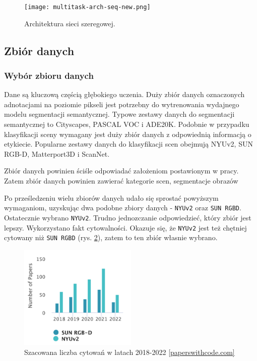 \begin{figure}[ht!]
    \centering
    \texttt{[image: multitask-arch-seq-new.png]}
    \caption{Architektura sieci szeregowej.}
    \label{fig:multitask-seq}
\end{figure}



\subsection{Zbiór  danych}
\subsubsection{Wybór zbioru danych}
Dane są kluczową częścią głębokiego uczenia. Duży zbiór danych oznaczonych adnotacjami na poziomie pikseli jest potrzebny do wytrenowania wydajnego modelu segmentacji semantycznej. Typowe zestawy danych do segmentacji semantycznej to Cityscapes, PASCAL VOC i ADE20K. Podobnie w przypadku klasyfikacji sceny wymagany jest duży zbiór danych z odpowiednią informacją o etykiecie. Popularne zestawy danych do klasyfikacji scen obejmują  NYUv2, SUN RGB-D, Matterport3D i ScanNet.

Zbiór danych powinien ściśle odpowiadać założeniom postawionym w pracy. Zatem zbiór danych powinien zawierać kategorie scen, segmentacje obrazów 

Po prześledzeniu wielu zbiorów danych udało się sprostać powyższym wymaganiom, uzyskując dwa podobne zbiory danych - \texttt{NYUv2} oraz \texttt{SUN RGBD}. Ostatecznie wybrano \texttt{NYUv2}. Trudno jednozczanie odpowiedzieć, który zbiór jest lepszy. Wykorzystano fakt cytowalności. Okazuje się, że \texttt{NYUv2} jest też chętniej cytowany niż \texttt{SUN RGBD} (rys. \ref{fig:sun-vs-nyu}), zatem to ten zbiór własnie wybrano.

\begin{figure}[ht!]
    \centering
    \includegraphics[width=0.5\textwidth]{img/stats-dataset.png}
    \caption[]{Szacowana liczba cytowań w latach 2018-2022 \href{https://paperswithcode.com/dataset/sun-rgb-d}{[paperswithcode.com]}}
    \label{fig:sun-vs-nyu}
\end{figure}

